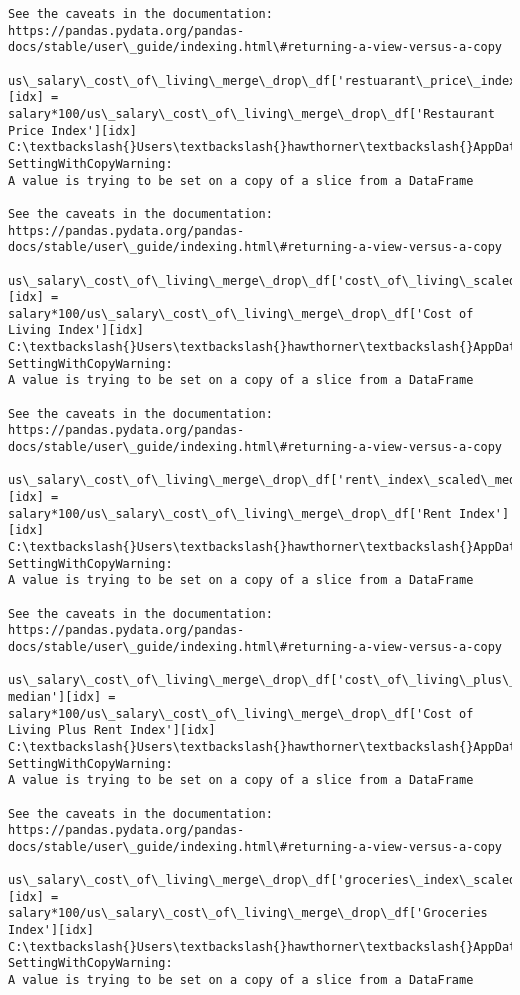 \documentclass[11pt]{article}
\begin{document}
\begin{Verbatim}[commandchars=\\\{\}]
See the caveats in the documentation: https://pandas.pydata.org/pandas-
docs/stable/user\_guide/indexing.html\#returning-a-view-versus-a-copy
  us\_salary\_cost\_of\_living\_merge\_drop\_df['restuarant\_price\_index\_q1'][idx] =
salary*100/us\_salary\_cost\_of\_living\_merge\_drop\_df['Restaurant Price Index'][idx]
C:\textbackslash{}Users\textbackslash{}hawthorner\textbackslash{}AppData\textbackslash{}Local\textbackslash{}Temp\textbackslash{}ipykernel\_22188\textbackslash{}94921046.py:29:
SettingWithCopyWarning:
A value is trying to be set on a copy of a slice from a DataFrame

See the caveats in the documentation: https://pandas.pydata.org/pandas-
docs/stable/user\_guide/indexing.html\#returning-a-view-versus-a-copy
  us\_salary\_cost\_of\_living\_merge\_drop\_df['cost\_of\_living\_scaled\_median'][idx] =
salary*100/us\_salary\_cost\_of\_living\_merge\_drop\_df['Cost of Living Index'][idx]
C:\textbackslash{}Users\textbackslash{}hawthorner\textbackslash{}AppData\textbackslash{}Local\textbackslash{}Temp\textbackslash{}ipykernel\_22188\textbackslash{}94921046.py:30:
SettingWithCopyWarning:
A value is trying to be set on a copy of a slice from a DataFrame

See the caveats in the documentation: https://pandas.pydata.org/pandas-
docs/stable/user\_guide/indexing.html\#returning-a-view-versus-a-copy
  us\_salary\_cost\_of\_living\_merge\_drop\_df['rent\_index\_scaled\_median'][idx] =
salary*100/us\_salary\_cost\_of\_living\_merge\_drop\_df['Rent Index'][idx]
C:\textbackslash{}Users\textbackslash{}hawthorner\textbackslash{}AppData\textbackslash{}Local\textbackslash{}Temp\textbackslash{}ipykernel\_22188\textbackslash{}94921046.py:31:
SettingWithCopyWarning:
A value is trying to be set on a copy of a slice from a DataFrame

See the caveats in the documentation: https://pandas.pydata.org/pandas-
docs/stable/user\_guide/indexing.html\#returning-a-view-versus-a-copy
  us\_salary\_cost\_of\_living\_merge\_drop\_df['cost\_of\_living\_plus\_rent\_index\_scaled\_
median'][idx] = salary*100/us\_salary\_cost\_of\_living\_merge\_drop\_df['Cost of
Living Plus Rent Index'][idx]
C:\textbackslash{}Users\textbackslash{}hawthorner\textbackslash{}AppData\textbackslash{}Local\textbackslash{}Temp\textbackslash{}ipykernel\_22188\textbackslash{}94921046.py:32:
SettingWithCopyWarning:
A value is trying to be set on a copy of a slice from a DataFrame

See the caveats in the documentation: https://pandas.pydata.org/pandas-
docs/stable/user\_guide/indexing.html\#returning-a-view-versus-a-copy
  us\_salary\_cost\_of\_living\_merge\_drop\_df['groceries\_index\_scaled\_median'][idx] =
salary*100/us\_salary\_cost\_of\_living\_merge\_drop\_df['Groceries Index'][idx]
C:\textbackslash{}Users\textbackslash{}hawthorner\textbackslash{}AppData\textbackslash{}Local\textbackslash{}Temp\textbackslash{}ipykernel\_22188\textbackslash{}94921046.py:33:
SettingWithCopyWarning:
A value is trying to be set on a copy of a slice from a DataFrame


\end{Verbatim}
\end{document}
